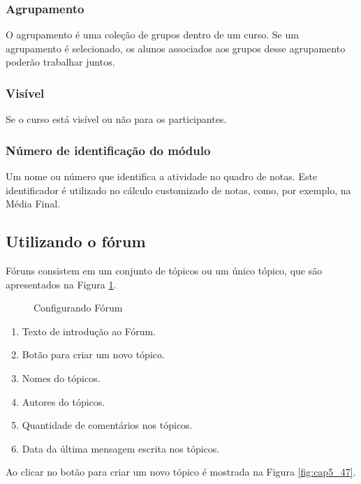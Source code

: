 \subsubsection{Agrupamento}
O agrupamento é uma coleção de grupos dentro de um curso. Se um agrupamento é selecionado, os alunos associados aos grupos desse agrupamento poderão trabalhar juntos.
\subsubsection{Visível}
Se o curso está visível ou não para os participantes.
\subsubsection{Número de identificação do módulo}
Um nome ou número que identifica a atividade no quadro de notas. Este identificador é utilizado no cálculo customizado de notas, como, por exemplo, na Média Final.
\subsection{Utilizando o fórum}
Fóruns consistem em um conjunto de tópicos ou um único tópico, que são apresentados na Figura \ref{fig:cap5_46}.

 \begin{figure}[!htbp]
 \begin{center}
  \caption{Configurando Fórum}
  \label{fig:cap5_46}
 \end{center}
\end{figure}

\begin{enumerate}
\item Texto de introdução ao Fórum.
\item Botão para criar um novo tópico.
\item Nomes do tópicos.
\item Autores do tópicos.
\item Quantidade de comentários nos tópicos.
\item Data da última mensagem escrita nos tópicos.
\end{enumerate}
Ao clicar no botão para criar um novo tópico é mostrada na Figura \ref{fig:cap5_47}.

